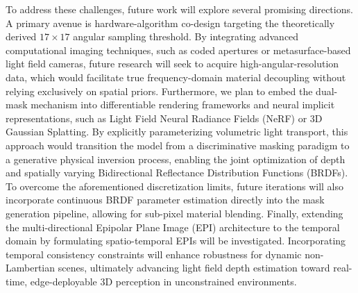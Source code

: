 \documentclass[lettersize,journal]{IEEEtran}
\begin{document}
To address these challenges, future work will explore several promising directions. A primary avenue is hardware-algorithm co-design targeting the theoretically derived $17 \times 17$ angular sampling threshold. By integrating advanced computational imaging techniques, such as coded apertures or metasurface-based light field cameras, future research will seek to acquire high-angular-resolution data, which would facilitate true frequency-domain material decoupling without relying exclusively on spatial priors. Furthermore, we plan to embed the dual-mask mechanism into differentiable rendering frameworks and neural implicit representations, such as Light Field Neural Radiance Fields (NeRF) or 3D Gaussian Splatting. By explicitly parameterizing volumetric light transport, this approach would transition the model from a discriminative masking paradigm to a generative physical inversion process, enabling the joint optimization of depth and spatially varying Bidirectional Reflectance Distribution Functions (BRDFs). To overcome the aforementioned discretization limits, future iterations will also incorporate continuous BRDF parameter estimation directly into the mask generation pipeline, allowing for sub-pixel material blending. Finally, extending the multi-directional Epipolar Plane Image (EPI) architecture to the temporal domain by formulating spatio-temporal EPIs will be investigated. Incorporating temporal consistency constraints will enhance robustness for dynamic non-Lambertian scenes, ultimately advancing light field depth estimation toward real-time, edge-deployable 3D perception in unconstrained environments.



\end{document}
